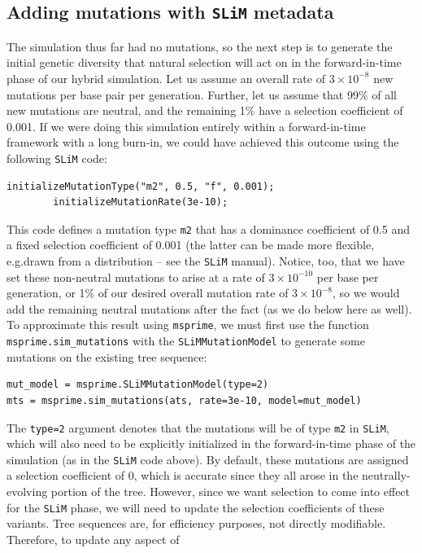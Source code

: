 \documentclass[12pt]{article}
\newcommand{\msprime}[0]{\texttt{msprime}\xspace}
\newcommand{\slim}[0]{\texttt{SLiM}\xspace}
\newcommand*{\eg}{e.g.\xcomma}
\begin{document}
\subsection{Adding mutations with \slim metadata}

The simulation thus far had no mutations, so
the next step is to generate the initial genetic diversity that natural selection will act on
in the forward-in-time phase of our hybrid simulation. Let us assume an overall rate of $3 \times 10^{-8}$ new
mutations per base pair per generation. Further, let us assume that 99\% of all new mutations
are neutral, and the remaining 1\% have a selection coefficient of 0.001.
If we were doing this simulation entirely within a forward-in-time framework with a long
burn-in, we could have achieved this outcome using the following \slim code:
\begin{lstlisting}[language=slim, style=slimstyle, breaklines=true]
        initializeMutationType("m2", 0.5, "f", 0.001);
        initializeMutationRate(3e-10);
\end{lstlisting}
This code defines a mutation type \verb|m2| that has a dominance coefficient of 0.5 and a fixed selection
coefficient of 0.001 (the latter can be made more flexible, \eg drawn from a distribution -- see the \slim manual).
Notice, too, that we have set these non-neutral mutations to arise at a rate of $3 \times 10^{-10}$ per base per generation,
or 1\% of our desired overall mutation rate of $3 \times 10^{-8}$,
so we would add the remaining neutral mutations after the fact (as we do below here as well).
To approximate this result using \msprime, we must first
use the function \verb|msprime.sim_mutations|
with the \verb|SLiMMutationModel| to generate some mutations on the existing tree sequence:
\begin{verbatim}
mut_model = msprime.SLiMMutationModel(type=2)
mts = msprime.sim_mutations(ats, rate=3e-10, model=mut_model)
\end{verbatim}
The \verb|type=2| argument denotes that the mutations will be of type \verb|m2| in \slim, which will also
need to be explicitly initialized in the forward-in-time phase of the simulation (as in the \slim code above).
By default, these mutations are assigned a selection coefficient of 0, which is accurate since they
all arose in the neutrally-evolving portion of the tree. However, since we want selection to come into
effect for the \slim phase, we will need to update the selection coefficients of these variants.
Tree sequences are, for efficiency purposes, not directly modifiable. Therefore, to update any aspect of
\end{document}
